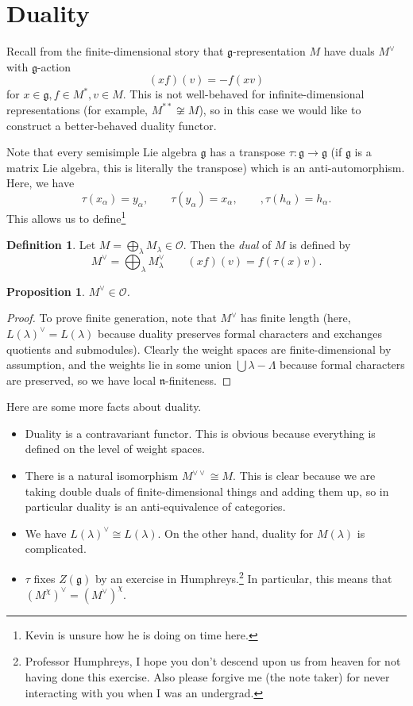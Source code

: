 \documentclass[leqno, openany]{memoir}
\newtheorem{prop}[thm]{Proposition}
\theoremstyle{definition}
\newtheorem{defn}[thm]{Definition}
\theoremstyle{remark}
\theoremstyle{plain}
\theoremstyle{definition}
\theoremstyle{remark}
\newcommand{\cO}{\mathcal{O}}
\newcommand{\g}{\mathfrak{g}}
\newcommand{\n}{\mathfrak{n}}
\begin{document}
\section{Duality}%
\label{sec:duality}

Recall from the finite-dimensional story that $\g$-representation $M$ have duals $M^{\vee}$ with $\g$-action
\[ (xf)(v) = - f(xv) \]
for $x \in \g, f \in M^{*}, v \in M$. This is not well-behaved for infinite-dimensional representations (for example, $M^{**} \not\cong M$), so in this case we would like to construct a better-behaved duality functor.

Note that every semisimple Lie algebra $\g$ has a transpose $\tau \colon \g \to \g$ (if $\g$ is a matrix Lie algebra, this is literally the transpose) which is an anti-automorphism. Here, we have
\[ \tau(x_{\alpha}) = y_{\alpha}, \qquad \tau(y_{\alpha}) = x_{\alpha}, \qquad, \tau(h_{\alpha}) = h_{\alpha}. \]
This allows us to define\footnote{Kevin is unsure how he is doing on time here.}
\begin{defn}
    Let $M = \bigoplus_{\lambda} M_{\lambda} \in \cO$. Then the \textit{dual} of $M$ is defined by
    \[ M^{\vee} = \bigoplus_{\lambda} M_{\lambda}^{\vee} \qquad (xf)(v) = f(\tau(x)v). \]
\end{defn}

\begin{prop}
    $M^{\vee} \in \cO$.
\end{prop}

\begin{proof}
    To prove finite generation, note that $M^{\vee}$ has finite length (here, ${L(\lambda)}^{\vee} = L(\lambda)$ because duality preserves formal characters and exchanges quotients and submodules). Clearly the weight spaces are finite-dimensional by assumption, and the weights lie in some union $\bigcup \lambda - \Lambda$ because formal characters are preserved, so we have local $\n$-finiteness.
\end{proof}

Here are some more facts about duality.
\begin{itemize}
    \item Duality is a contravariant functor. This is obvious because everything is defined on the level of weight spaces.
    \item There is a natural isomorphism $M^{\vee \vee} \cong M$. This is clear because we are taking double duals of finite-dimensional things and adding them up, so in particular duality is an anti-equivalence of categories.
    \item We have ${L(\lambda)}^{\vee} \cong L(\lambda)$. On the other hand, duality for $M(\lambda)$ is complicated.
    \item $\tau$ fixes $Z(\g)$ by an exercise in Humphreys.\footnote{Professor Humphreys, I hope you don't descend upon us from heaven for not having done this exercise. Also please forgive me (the note taker) for never interacting with you when I was an undergrad.} In particular, this means that ${(M^{\chi})}^{\vee} = {(M^{\vee})}^{\chi}$.
\end{itemize}
\end{document}
